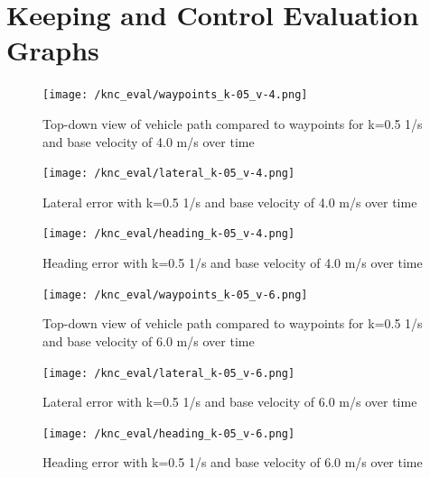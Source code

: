 \documentclass[titlepage, draft]{article}
\begin{document}
{\appendix

\section{Keeping and Control Evaluation Graphs}
\label{FirstAppendix}

\begin{figure}[H]
	\centering
	\begin{minipage}{.45\textwidth}
		\centering
		\texttt{[image: /knc\_eval/waypoints\_k-05\_v-4.png]}
		\caption{Top-down view of vehicle path compared to waypoints for k=0.5 1/s and base velocity of 4.0 m/s over time}
		\label{fig:wayk5v4}
	\end{minipage}%
	\hspace{0.1\textwidth}%
	\begin{minipage}{.45\textwidth}
		\centering
		\texttt{[image: /knc\_eval/lateral\_k-05\_v-4.png]}
		\caption{Lateral error with k=0.5 1/s and base velocity of 4.0 m/s over time}
		\label{fig:latk5v4}
	\end{minipage}
\end{figure}

\begin{figure}[H]
	\centering
	\begin{minipage}{.45\textwidth}
		\centering
		\texttt{[image: /knc\_eval/heading\_k-05\_v-4.png]}
		\caption{Heading error with k=0.5 1/s and base velocity of 4.0 m/s over time}
		\label{fig:headk5v4}
	\end{minipage}%
	\hspace{0.1\textwidth}%
	\begin{minipage}{.45\textwidth}
		\centering
		\texttt{[image: /knc\_eval/waypoints\_k-05\_v-6.png]}
		\caption{Top-down view of vehicle path compared to waypoints for k=0.5 1/s and base velocity of 6.0 m/s over time}
		\label{fig:wayk5v6}
	\end{minipage}
\end{figure}

\begin{figure}[H]
	\centering
	\begin{minipage}{.45\textwidth}
		\centering
		\texttt{[image: /knc\_eval/lateral\_k-05\_v-6.png]}
		\caption{Lateral error with k=0.5 1/s and base velocity of 6.0 m/s over time}
		\label{fig:latk5v6}
	\end{minipage}%
	\hspace{0.1\textwidth}%
	\begin{minipage}{.45\textwidth}
		\centering
		\texttt{[image: /knc\_eval/heading\_k-05\_v-6.png]}
		\caption{Heading error with k=0.5 1/s and base velocity of 6.0 m/s over time}
		\label{fig:headk5v6}
	\end{minipage}
\end{figure}

}
\end{document}
